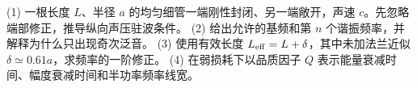 (1) 一根长度 \(L\)、半径 \(a\) 的均匀细管一端刚性封闭、另一端敞开，声速 \(c\)。先忽略端部修正，推导纵向声压驻波条件。
(2) 给出允许的基频和第 \(n\) 个谐振频率，并解释为什么只出现奇次泛音。
(3) 使用有效长度 \(L_{\rm eff}=L+\delta\)，其中未加法兰近似 \(\delta\simeq0.61a\)，求频率的一阶修正。
(4) 在弱损耗下以品质因子 \(Q\) 表示能量衰减时间、幅度衰减时间和半功率频率线宽。
